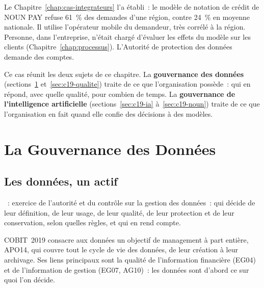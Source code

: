 Le Chapitre~\ref{chap:cas-integrateurs} l'a établi~: le modèle de notation
de crédit de NOUN PAY refuse 61~\% des demandes d'une région, contre
24~\% en moyenne nationale. Il utilise l'opérateur mobile du demandeur,
très corrélé à la région. Personne, dans l'entreprise, n'était chargé
d'évaluer les effets du modèle sur les clients (Chapitre~\ref{chap:processus}).
L'Autorité de protection des données demande des comptes.

Ce cas réunit les deux sujets de ce chapitre. La \textbf{gouvernance des
données} (sections~\ref{sec:c19-donnees} et~\ref{sec:c19-qualite}) traite
de ce que l'organisation possède~: qui en répond, avec quelle qualité, pour
combien de temps. La \textbf{gouvernance de l'intelligence artificielle}
(sections~\ref{sec:c19-ia} à~\ref{sec:c19-noun}) traite de ce que
l'organisation en fait quand elle confie des décisions à des modèles.

\separateur

\section{La Gouvernance des Données}
\label{sec:c19-donnees}

\subsection{Les données, un actif}

\begin{boxdef}
~:
exercice de l'autorité et du contrôle sur la gestion des données~:
qui décide de leur définition, de leur usage, de leur qualité, de leur
protection et de leur conservation, selon quelles règles, et qui en rend
compte.
\end{boxdef}

COBIT~2019 consacre aux données un objectif de management à part entière,
APO14, qui couvre tout le cycle de vie des données, de leur création à
leur archivage. Ses liens principaux sont la qualité de l'information
financière (EG04) et de l'information de gestion (EG07, AG10)~: les
données sont d'abord ce sur quoi l'on décide.

